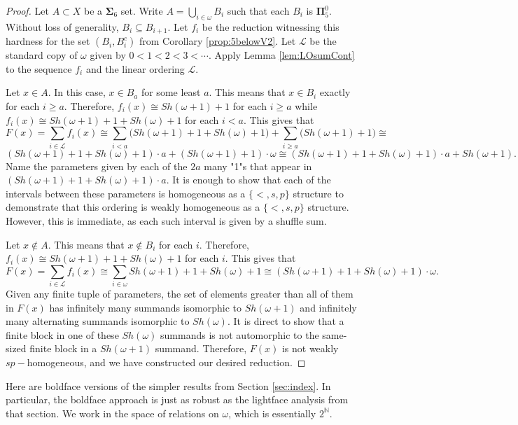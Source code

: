 \documentclass[11pt]{amsart}
\theoremstyle{definition}
\def\bN{{\mathbb N}}
\begin{document}
\begin{proof}
Let $A\subset X$ be a $\mathbf{\Sigma}_6$ set.
Write $A=\bigcup_{i\in\omega} B_i$ such that each $B_i$ is $\mathbf{\Pi}_5^0$.
Without loss of generality, $B_i\subseteq B_{i+1}$.
Let $f_{i}$ be the reduction witnessing this hardness for the set $(B_i,B_i^c)$ from Corollary \ref{prop:5belowV2}.
Let $\mathcal{L}$ be the standard copy of $\omega$ given by $0<1<2<3<\cdots$.
Apply Lemma \ref{lem:LOsumCont} to the sequence $f_i$ and the linear ordering $\mathcal{L}$.

Let $x\in A$.
In this case, $x\in B_a$ for some least $a$.
This means that $x\in B_i$ exactly for each $i\geq a$.
Therefore, $f_i(x)\cong Sh(\omega+1)+1$ for each $i\geq a$ while $f_i(x)\cong Sh(\omega+1)+1+Sh(\omega)+1$ for each $i< a$.
This gives that
\[
F(x) = \sum_{i\in\mathcal{L}} f_i(x) \cong\sum_{i<a}\Big(Sh(\omega+1)+1+Sh(\omega)+1\Big) +\sum_{i\geq a}\Big(Sh(\omega+1)+1\Big)\cong
\]
\[
(Sh(\omega+1)+1+Sh(\omega)+1)\cdot a + (Sh(\omega+1)+1)\cdot\omega \cong (Sh(\omega+1)+1+Sh(\omega)+1)\cdot a + Sh(\omega+1).
\]
Name the parameters given by each of the $2a$ many "1"s that appear in $(Sh(\omega+1)+1+Sh(\omega)+1)\cdot a$.
It is enough to show that each of the intervals between these parameters is homogeneous as a $\{<,s,p\}$ structure to demonstrate that this ordering is weakly homogeneous as a $\{<,s,p\}$ structure.
However, this is immediate, as each such interval is given by a shuffle sum.



Let $x\not\in A$.
This means that $x\not\in B_i$ for each $i$.
Therefore, $f_i(x)\cong Sh(\omega+1)+1+Sh(\omega)+1$ for each $i$.
This gives that
\[
F(x) = \sum_{i\in\mathcal{L}} f_i(x) \cong \sum_{i\in\omega} Sh(\omega+1)+1+Sh(\omega)+1 \cong (Sh(\omega+1)+1+Sh(\omega)+1)\cdot\omega.
\]
Given any finite tuple of parameters, the set of elements greater than all of them in $F(x)$ has infinitely many summands isomorphic to $Sh(\omega+1)$ and infinitely many alternating summands isomorphic to $Sh(\omega)$.
It is direct to show that a finite block in one of these $Sh(\omega)$ summands is not automorphic to the same-sized finite block in a $Sh(\omega+1)$ summand.
Therefore, $F(x)$ is not weakly $sp-$homogeneous, and we have constructed our desired reduction.
\end{proof}

Here are boldface versions of the simpler results from Section \ref{sec:index}.
In particular, the boldface approach is just as robust as the lightface analysis from that section.
We work in the space of relations on $\omega$, which is essentially $2^{\bN}$.
\end{document}
